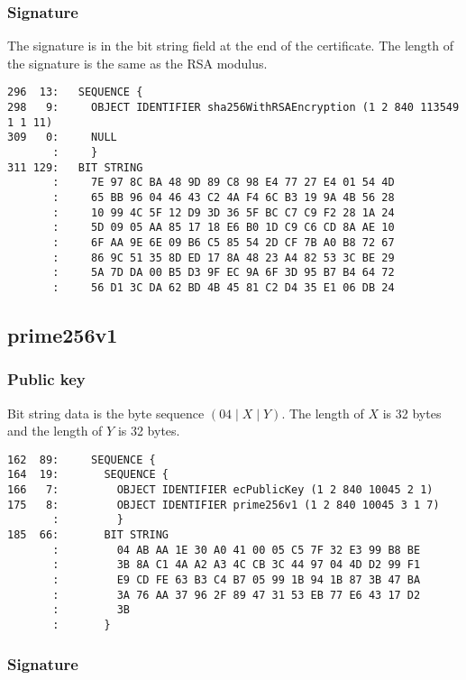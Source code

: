 \documentclass[12pt]{article}
\begin{document}
\subsubsection{Signature}

\noindent
The signature is in the bit string field at the end of the certificate.
The length of the signature is the same as the RSA modulus.

\begin{verbatim}
296  13:   SEQUENCE {
298   9:     OBJECT IDENTIFIER sha256WithRSAEncryption (1 2 840 113549 1 1 11)
309   0:     NULL
       :     }
311 129:   BIT STRING
       :     7E 97 8C BA 48 9D 89 C8 98 E4 77 27 E4 01 54 4D
       :     65 BB 96 04 46 43 C2 4A F4 6C B3 19 9A 4B 56 28
       :     10 99 4C 5F 12 D9 3D 36 5F BC C7 C9 F2 28 1A 24
       :     5D 09 05 AA 85 17 18 E6 B0 1D C9 C6 CD 8A AE 10
       :     6F AA 9E 6E 09 B6 C5 85 54 2D CF 7B A0 B8 72 67
       :     86 9C 51 35 8D ED 17 8A 48 23 A4 82 53 3C BE 29
       :     5A 7D DA 00 B5 D3 9F EC 9A 6F 3D 95 B7 B4 64 72
       :     56 D1 3C DA 62 BD 4B 45 81 C2 D4 35 E1 06 DB 24
\end{verbatim}

\newpage
\subsection{prime256v1}

\subsubsection{Public key}

\noindent
Bit string data is the byte sequence $(04\mid X\mid Y)$.
The length of $X$ is 32 bytes and the length of $Y$ is 32 bytes.

\begin{verbatim}
162  89:     SEQUENCE {
164  19:       SEQUENCE {
166   7:         OBJECT IDENTIFIER ecPublicKey (1 2 840 10045 2 1)
175   8:         OBJECT IDENTIFIER prime256v1 (1 2 840 10045 3 1 7)
       :         }
185  66:       BIT STRING
       :         04 AB AA 1E 30 A0 41 00 05 C5 7F 32 E3 99 B8 BE
       :         3B 8A C1 4A A2 A3 4C CB 3C 44 97 04 4D D2 99 F1
       :         E9 CD FE 63 B3 C4 B7 05 99 1B 94 1B 87 3B 47 BA
       :         3A 76 AA 37 96 2F 89 47 31 53 EB 77 E6 43 17 D2
       :         3B
       :       }
\end{verbatim}

\subsubsection{Signature}
\end{document}
